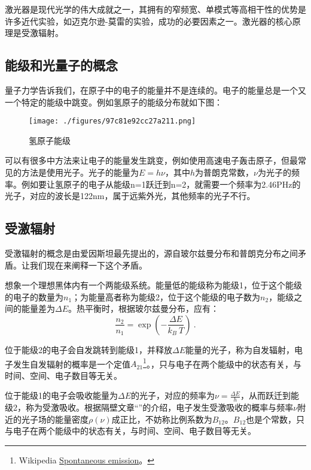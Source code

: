 

激光器是现代光学的伟大成就之一，其拥有的窄频宽、单模式等高相干性的优势是许多近代实验，如迈克尔逊-莫雷的实验，成功的必要因素之一。激光器的核心原理是受激辐射。

\subsection{能级和光量子的概念}
量子力学告诉我们，在原子中的电子的能量并不是连续的。电子的能量总是一个又一个特定的能级中跳变。例如氢原子的能级分布就如下图：\begin{figure}[ht]
\centering
\texttt{[image: ./figures/97c81e92cc27a211.png]}
\caption{氢原子能级} \label{fig_LaserT_1}
\end{figure}
可以有很多中方法来让电子的能量发生跳变，例如使用高速电子轰击原子，但最常见的方法是使用光子。光子的能量为$E=h\nu$，其中$h$为普朗克常数，$\nu$为光子的频率。例如要让氢原子的电子从能级n=1跃迁到n=2，就需要一个频率为2.46PHz的光子，对应的波长是122nm，属于远紫外光，其他频率的光子不行。
\subsection{受激辐射}
受激辐射的概念是由爱因斯坦最先提出的，源自玻尔兹曼分布和普朗克分布之间矛盾。让我们现在来阐释一下这个矛盾。

想象一个理想黑体内有一个两能级系统。能量低的能级称为能级1，位于这个能级的电子的数量为$n_1$；为能量高者称为能级2，位于这个能级的电子数为$n_2$，能级之间的能量差为$\Delta E$。热平衡时，根据玻尔兹曼分布，应有：
\begin{equation}
\frac{n_2}{n_1}=\exp(-\frac{\Delta E}{k_B \ T})~.
\end{equation}

位于能级2的电子会自发跳转到能级1，并释放$\Delta E$能量的光子，称为自发辐射，电子发生自发辐射的概率是一个定值$A_{21}$\footnote{ Wikipedia \href{https://en.wikipedia.org/wiki/Spontaneous_emission}{Spontaneous emission}。}。，只与电子在两个能级中的状态有关，与时间、空间、电子数目等无关。

位于能级1的电子会吸收能量为$\Delta E$的光子，对应的频率为$\nu=\frac{\Delta E}{h}$，从而跃迁到能级2，称为受激吸收。根据隔壁文章“”的介绍，电子发生受激吸收的概率与频率$\nu$附近的光子场的能量密度$\rho(\nu)$成正比，不妨称比例系数为$B_{12}$。$B_{12}$也是个常数，只与电子在两个能级中的状态有关，与时间、空间、电子数目等无关。

